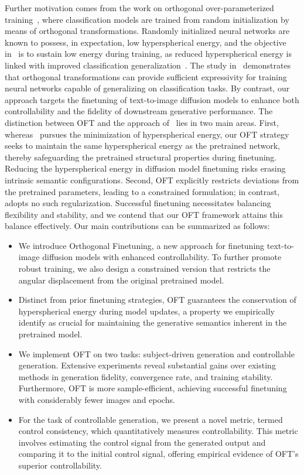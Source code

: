 Further motivation comes from the work on orthogonal over-parameterized training~\cite{liu2021orthogonal}, where classification models are trained from random initialization by means of orthogonal transformations. Randomly initialized neural networks are known to possess, in expectation, low hyperspherical energy, and the objective in~\cite{liu2021orthogonal} is to sustain low energy during training, as reduced hyperspherical energy is linked with improved classification generalization~\cite{liu2018learning,lin2020regularizing}. The study in~\cite{liu2021orthogonal} demonstrates that orthogonal transformations can provide sufficient expressivity for training neural networks capable of generalizing on classification tasks. By contrast, our approach targets the finetuning of text-to-image diffusion models to enhance both controllability and the fidelity of downstream generative performance. The distinction between OFT and the approach of~\cite{liu2021orthogonal} lies in two main areas. First, whereas~\cite{liu2021orthogonal} pursues the minimization of hyperspherical energy, our OFT strategy seeks to maintain the same hyperspherical energy as the pretrained network, thereby safeguarding the pretrained structural properties during finetuning. Reducing the hyperspherical energy in diffusion model finetuning risks erasing intrinsic semantic configurations. Second, OFT explicitly restricts deviations from the pretrained parameters, leading to a constrained formulation; in contrast,~\cite{liu2021orthogonal} adopts no such regularization. Successful finetuning necessitates balancing flexibility and stability, and we contend that our OFT framework attains this balance effectively. Our main contributions can be summarized as follows:

\begin{itemize}[leftmargin=*,nosep]

    \item We introduce Orthogonal Finetuning, a new approach for finetuning text-to-image diffusion models with enhanced controllability. To further promote robust training, we also design a constrained version that restricts the angular displacement from the original pretrained model.
    \item Distinct from prior finetuning strategies, OFT guarantees the conservation of hyperspherical energy during model updates, a property we empirically identify as crucial for maintaining the generative semantics inherent in the pretrained model.
    \item We implement OFT on two tasks: subject-driven generation and controllable generation. Extensive experiments reveal substantial gains over existing methods in generation fidelity, convergence rate, and training stability. Furthermore, OFT is more sample-efficient, achieving successful finetuning with considerably fewer images and epochs.
    \item For the task of controllable generation, we present a novel metric, termed control consistency, which quantitatively measures controllability. This metric involves estimating the control signal from the generated output and comparing it to the initial control signal, offering empirical evidence of OFT’s superior controllability.
\end{itemize}

